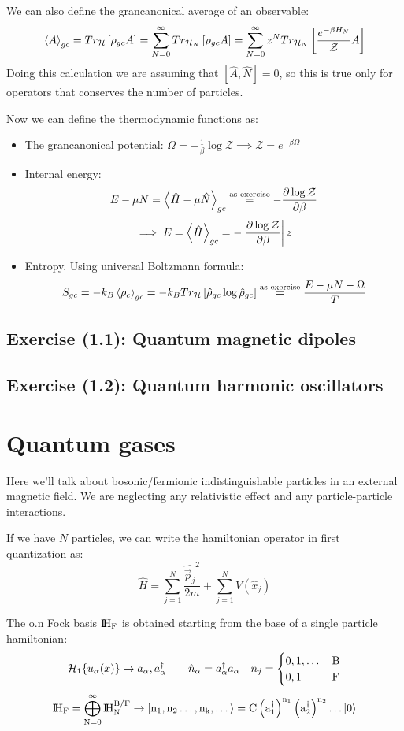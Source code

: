 We can also define the grancanonical average of an observable:
$$ \left<A\right>_{gc} = Tr_{\mathcal{H}} \left[\rho_{gc} A\right] = \sum_{N=0}^\infty Tr_{\mathcal{H}_N} \left[\rho_{gc} A\right] = \sum_{N=0}^\infty z^N Tr_{\mathcal{H}_N}\left[\frac{e^{-\beta H_N}}{\mathcal Z} A \right]$$
Doing this calculation we are assuming that $\left[\hat A, \hat N\right] = 0$, so this is true only for operators that conserves the number of particles.

Now we can define the thermodynamic functions as: \begin{itemize}
    \item The grancanonical potential: $ \Omega = -\frac 1\beta \log \mathcal Z \implies \mathcal Z = e^{-\beta \Omega}$
    \item Internal energy:
    $$ E -\mu N = \left<\hat H - \mu \hat N\right>_{gc} \stackrel{\text{as exercise}}= -\frac{\partial\log\mathcal Z}{\partial\beta}$$
    $$\implies E = \left<\hat H\right>_{gc} = -\left.\frac{\partial\log \mathcal Z}{\partial\beta}\right|z$$
    \item  Entropy. Using universal Boltzmann formula:
    $$ S_{gc} = -k_B\left<\rho_c\right>_{gc} = -k_B Tr_{\mathcal{H}} \left[\hat \rho_{gc}\log \hat \rho_{gc}\right]\stackrel{\text{as exercise}}= \frac{E-\mu N - \Omega}T$$
\end{itemize}

\subsection{Exercise (1.1): Quantum magnetic dipoles}
\subsection{Exercise (1.2): Quantum harmonic oscillators}

\vspace{20pt}

\section{Quantum gases}
Here we'll talk about bosonic/fermionic indistinguishable particles in an external magnetic field. We are neglecting any relativistic effect and any particle-particle interactions.

If we have $N$ particles, we can write the hamiltonian operator in first quantization as:
$$ \hat H = \sum_{j=1}^N \frac{\widehat{\vec p_j}^2}{2m} + \sum_{j=1}^N V(\hat x_j)$$

The o.n Fock basis $\rm I\!H_F$ is obtained starting from the base of a single particle hamiltonian:
$$\mathcal{H}_1 \{u_\alpha(x)\} \to a_\alpha, a_\alpha^\dag \qquad \hat n_\alpha = a_\alpha^\dag a_\alpha \quad n_j = \begin{cases} 0,1,\dots &\text{B} \\ 0,1 &\text{F}\end{cases}$$
$$ \rm I\!H_F = \bigoplus _{N=0}^\infty \rm I\!H_N^{B/F} \to \left|n_1,n_2\dots, n_k,\dots\right\rangle = C\left(a_1^\dag\right)^{n_1} \left(a_2^\dag\right)^{n_2} \dots \left|0\right\rangle $$

